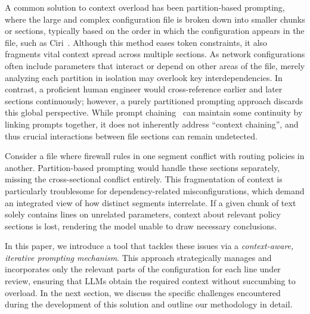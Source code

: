 A common solution to context overload has been partition-based prompting,
where the large and complex configuration file is broken down into smaller
chunks or sections, typically based on the order in which the configuration
appears in the file,  such as Ciri~\cite{lian2023configuration}.
 Although this method eases token constraints, it also fragments
vital context spread across multiple sections. As network configurations often include
parameters that interact or depend on other areas of the file, merely analyzing each
partition in isolation may overlook key interdependencies. In contrast, a proficient
human engineer would cross-reference earlier and later sections continuously; however,
a purely partitioned prompting approach discards this global perspective. While prompt
chaining~\cite{wang2024identifying,bogdanov2024leveraging} can maintain some continuity
by linking prompts together, it does not inherently address “context chaining”, and
thus crucial interactions between file sections can remain undetected.

Consider a file where firewall rules in one segment conflict with routing policies
in another. Partition-based prompting would handle these sections separately, missing
the cross-sectional conflict entirely. This fragmentation of context is particularly
troublesome for dependency-related misconfigurations, which demand an integrated view
of how distinct segments interrelate. If a given chunk of text solely contains lines
on unrelated parameters, context about relevant policy sections is lost, rendering
the model unable to draw necessary conclusions.

In this paper, we introduce a tool that tackles these issues via a \emph{context-aware,
	iterative prompting mechanism}. This approach strategically manages and incorporates
only the relevant parts of the configuration for each line under review, ensuring that
LLMs obtain the required context without succumbing to overload. In the next section,
we discuss the specific challenges encountered during the development of this solution
and outline our methodology in detail.




